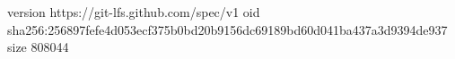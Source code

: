 version https://git-lfs.github.com/spec/v1
oid sha256:256897fefe4d053ecf375b0bd20b9156dc69189bd60d041ba437a3d9394de937
size 808044
